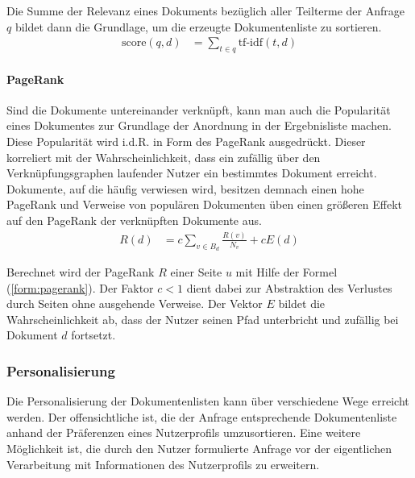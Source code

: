 Die Summe der Relevanz eines Dokuments bezüglich aller Teilterme der Anfrage $q$ bildet dann die Grundlage, um die erzeugte Dokumentenliste zu sortieren.\citep{Manning2008} 
\begin{align}
\text{score}(q,d) & = \sum_{t \in q}{\text{tf-idf}(t,d)}  \label{form:docscore}
\end{align}

\paragraph{PageRank} Sind die Dokumente untereinander verknüpft, kann man auch die Popularität eines Dokumentes zur Grundlage der Anordnung in der Ergebnisliste machen. Diese Popularität wird i.d.R. in Form des PageRank ausgedrückt. Dieser korreliert mit der Wahrscheinlichkeit, dass ein zufällig über den Verknüpfungsgraphen laufender Nutzer ein bestimmtes Dokument erreicht. Dokumente, auf die häufig verwiesen wird, besitzen demnach einen hohe PageRank und Verweise von populären Dokumenten üben einen größeren Effekt auf den PageRank der verknüpften Dokumente aus.
\begin{align}
R(d) & = c \sum_{v \in B_d}{\frac{R(v)}{N_v}} + cE(d) \label{form:pagerank}
\end{align}

Berechnet wird der PageRank $R$ einer Seite $u$ mit Hilfe der Formel (\ref{form:pagerank}). Der Faktor $c < 1$ dient dabei zur Abstraktion des Verlustes durch Seiten ohne ausgehende Verweise. Der Vektor $E$ bildet die Wahrscheinlichkeit ab, dass der Nutzer seinen Pfad unterbricht und zufällig bei Dokument $d$ fortsetzt.\citep{pagerank,Manning2008}

\subsubsection{Personalisierung}\label{sec:personalresultstheorie}

Die Personalisierung der Dokumentenlisten kann über verschiedene Wege erreicht werden. Der offensichtliche ist, die der Anfrage entsprechende Dokumentenliste anhand der Präferenzen eines Nutzerprofils umzusortieren. Eine weitere Möglichkeit ist, die durch den Nutzer formulierte Anfrage vor der eigentlichen Verarbeitung mit Informationen des Nutzerprofils zu erweitern.

